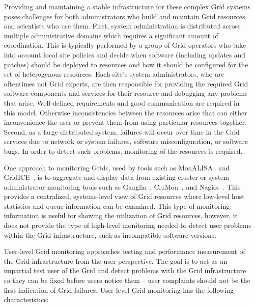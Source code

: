 \documentclass[times, 10pt,twocolumn]{article}
\begin{document}
Providing and maintaining a stable infrastructure for these complex 
Grid systems poses challenges for both administrators who build and
maintain Grid resources and scientists who use them.  First, system
administration is distributed across multiple administrative domains which
requires a significant amount of coordination.  This is typically performed by
a group of Grid operators who take into account local site policies 
and decide when software (including updates and patches) should be deployed to
resources and how it should be configured for the set of heterogenous
resources.  Each site's system administrators, who are oftentimes not Grid
experts, are then responsible for providing the required Grid software
components and services for their resource and debugging any problems that
arise.  Well-defined requirements and good communication are required in this
model.  Otherwise inconsistencies between the resources arise that can either
inconvenience the user or prevent them from using particular resources
together.  Second, as a large distributed system, failures will occur over
time in the Grid services due to network or system failures, software
misconfiguration, or software bugs.  In order to detect such problems, 
monitoring of the resources is required.  

One approach to monitoring Grids, used by tools such as
MonALISA~\cite{monalisa} and GridICE~\cite{gridice}, is to aggregate and
display data from existing cluster or system administrator monitoring tools
such as Ganglia~\cite{ganglia}, CluMon~\cite{clumon}, and
Nagios~\cite{nagios}.  This provides a centralized, systems-level view of Grid
resources where low-level host statistics and queue information can be
examined.  This type of monitoring information is useful for showing the
utilization of Grid resources, however, it does not provide the type of
high-level monitoring needed to detect user problems within the Grid
infrastructure, such as incompatible software versions.  

User-level Grid monitoring approaches testing and performance measurement of
the Grid infrastructure from the user perspective.  The goal is to act as an
impartial test user of the Grid and detect problems with the Grid
infrastructure so they can be fixed before users notice them -- user
complaints should not be the first indication of Grid failures.  User-level
Grid monitoring has the following characteristics:
\end{document}
